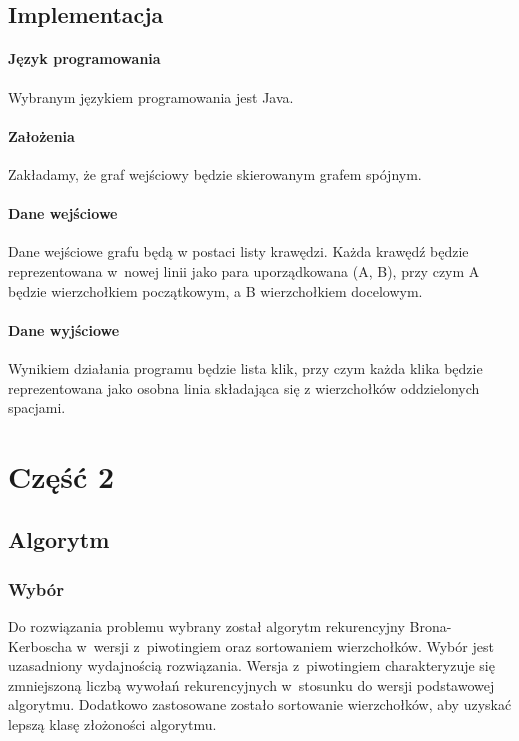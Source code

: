 \documentclass[11pt,a4paper]{article}
\begin{document}
\subsection{Implementacja}
\paragraph{Język programowania} Wybranym językiem programowania jest Java.
\paragraph{Założenia} Zakładamy, że graf wejściowy będzie skierowanym grafem spójnym.
\paragraph{Dane wejściowe} Dane wejściowe grafu będą w postaci listy krawędzi. Każda krawędź będzie reprezentowana w~nowej linii jako para uporządkowana (A, B), przy czym A będzie wierzchołkiem początkowym, a B wierzchołkiem docelowym.
\paragraph{Dane wyjściowe} Wynikiem działania programu będzie lista klik, przy czym każda klika będzie reprezentowana jako osobna linia składająca się z wierzchołków oddzielonych spacjami.

\newpage
\section{Część 2}
\subsection{Algorytm}
\subsubsection{Wybór}
Do rozwiązania problemu wybrany został algorytm rekurencyjny Brona-Kerboscha w~wersji z~piwotingiem oraz sortowaniem wierzchołków. Wybór jest uzasadniony wydajnością rozwiązania. Wersja z~piwotingiem charakteryzuje się zmniejszoną liczbą wywołań rekurencyjnych w~stosunku do wersji podstawowej algorytmu. Dodatkowo zastosowane zostało sortowanie wierzchołków, aby uzyskać lepszą klasę złożoności algorytmu.
\end{document}
